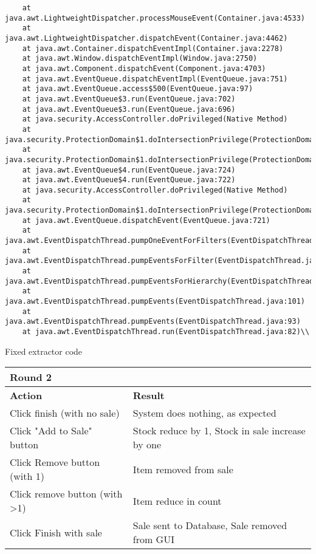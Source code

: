 \documentclass[11pt,a4paper]{article}
\begin{document}
\begin{lstlisting}
	at java.awt.LightweightDispatcher.processMouseEvent(Container.java:4533)
	at java.awt.LightweightDispatcher.dispatchEvent(Container.java:4462)
	at java.awt.Container.dispatchEventImpl(Container.java:2278)
	at java.awt.Window.dispatchEventImpl(Window.java:2750)
	at java.awt.Component.dispatchEvent(Component.java:4703)
	at java.awt.EventQueue.dispatchEventImpl(EventQueue.java:751)
	at java.awt.EventQueue.access$500(EventQueue.java:97)
	at java.awt.EventQueue$3.run(EventQueue.java:702)
	at java.awt.EventQueue$3.run(EventQueue.java:696)
	at java.security.AccessController.doPrivileged(Native Method)
	at java.security.ProtectionDomain$1.doIntersectionPrivilege(ProtectionDomain.java:75)
	at java.security.ProtectionDomain$1.doIntersectionPrivilege(ProtectionDomain.java:86)
	at java.awt.EventQueue$4.run(EventQueue.java:724)
	at java.awt.EventQueue$4.run(EventQueue.java:722)
	at java.security.AccessController.doPrivileged(Native Method)
	at java.security.ProtectionDomain$1.doIntersectionPrivilege(ProtectionDomain.java:75)
	at java.awt.EventQueue.dispatchEvent(EventQueue.java:721)
	at java.awt.EventDispatchThread.pumpOneEventForFilters(EventDispatchThread.java:201)
	at java.awt.EventDispatchThread.pumpEventsForFilter(EventDispatchThread.java:116)
	at java.awt.EventDispatchThread.pumpEventsForHierarchy(EventDispatchThread.java:105)
	at java.awt.EventDispatchThread.pumpEvents(EventDispatchThread.java:101)
	at java.awt.EventDispatchThread.pumpEvents(EventDispatchThread.java:93)
	at java.awt.EventDispatchThread.run(EventDispatchThread.java:82)\\
	\end{lstlisting}
	\newpage
	Fixed extractor code\\
	\hspace*{-0.1cm}
\begin{tabular}{|m{7cm}|m{7cm}|}
		\hline Round 2\\
		\hline \textbf{Action} & \textbf{Result}\\
		\hline Click finish (with no sale) & System does nothing, as expected\\
		\hline  Click "Add to Sale" button& Stock reduce by 1, Stock in sale increase by one\\
		\hline Click Remove button (with 1)& Item removed from sale\\
		\hline  Click remove button (with >1) & Item reduce in count\\
		\hline Click Finish with sale& Sale sent to Database, Sale removed from GUI \\
		\hline 
	\end{tabular}
	
\end{document}
